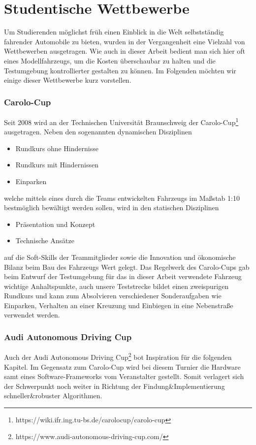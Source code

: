 \section{Studentische Wettbewerbe}
Um Studierenden möglichst früh einen Einblick in die Welt selbstständig fahrender Automobile zu bieten, wurden in der Vergangenheit eine Vielzahl von Wettbewerben ausgetragen. Wie auch in dieser Arbeit bedient man sich hier oft eines Modellfahrzeugs, um die Kosten überschaubar zu halten und die Testumgebung kontrollierter gestalten zu können. Im Folgenden möchten wir einige dieser Wettbewerbe kurz vorstellen.
\subsubsection{Carolo-Cup}
Seit 2008 wird an der Technischen Universität Braunschweig der Carolo-Cup\footnote{https://wiki.ifr.ing.tu-bs.de/carolocup/carolo-cup} ausgetragen. Neben den sogenannten dynamischen Disziplinen
\begin{itemize}
\item Rundkurs ohne Hindernisse
\item Rundkurs mit Hindernissen
\item Einparken
\end{itemize}
welche mittels eines durch die Teams entwickelten Fahrzeugs im Maßstab 1:10 bestmöglich bewältigt werden sollen, wird in den statischen Disziplinen
\begin{itemize}
\item Präsentation und Konzept
\item Technische Ansätze
\end{itemize}
auf die Soft-Skills der Teammitglieder sowie die Innovation und ökonomische Bilanz beim Bau des Fahrzeugs Wert gelegt. Das Regelwerk des Carolo-Cups gab beim Entwurf der Testumgebung für das in dieser Arbeit verwendete Fahrzeug wichtige Anhaltspunkte, auch unsere Teststrecke bildet einen zweispurigen Rundkurs und kann zum Absolvieren verschiedener Sonderaufgaben wie Einparken, Verhalten an einer Kreuzung und Einbiegen in eine Nebenstraße verwendet werden.

\subsubsection{Audi Autonomous Driving Cup}
Auch der Audi Autonomous Driving Cup\footnote{https://www.audi-autonomous-driving-cup.com/} bot Inspiration für die folgenden Kapitel. Im Gegensatz zum Carolo-Cup wird bei diesem Turnier die Hardware samt eines Software-Frameworks vom Veranstalter gestellt. Somit verlagert sich der Schwerpunkt noch weiter in Richtung der Findung\&Implementierung schneller\&robuster Algorithmen. 

